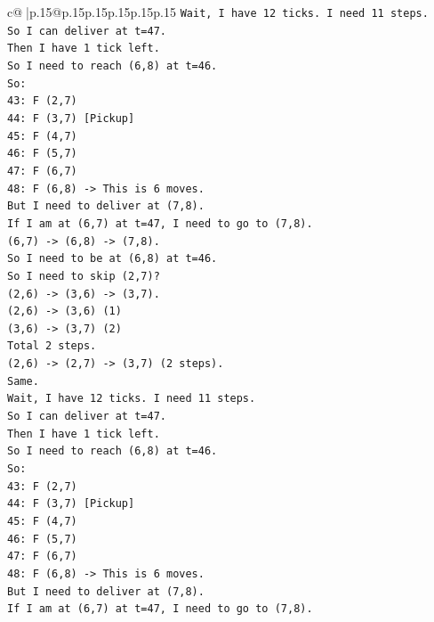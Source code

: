 \documentclass{article}
\begin{document}
{\begin{supertabular}{c@{$\;$}|p{.15\linewidth}@{}p{.15\linewidth}p{.15\linewidth}p{.15\linewidth}p{.15\linewidth}p{.15\linewidth}}
{{{\texttt{Wait, I have 12 ticks. I need 11 steps.} \\
\texttt{So I can deliver at t=47.} \\
\texttt{Then I have 1 tick left.} \\
\texttt{So I need to reach (6,8) at t=46.} \\
\texttt{So:} \\
\texttt{43: F (2,7)} \\
\texttt{44: F (3,7) {[}Pickup{]}} \\
\texttt{45: F (4,7)} \\
\texttt{46: F (5,7)} \\
\texttt{47: F (6,7)} \\
\texttt{48: F (6,8) {-}> This is 6 moves.} \\
\texttt{But I need to deliver at (7,8).} \\
\texttt{If I am at (6,7) at t=47, I need to go to (7,8).} \\
\texttt{(6,7) {-}> (6,8) {-}> (7,8).} \\
\texttt{So I need to be at (6,8) at t=46.} \\
\texttt{So I need to skip (2,7)?} \\
\texttt{(2,6) {-}> (3,6) {-}> (3,7).} \\
\texttt{(2,6) {-}> (3,6) (1)} \\
\texttt{(3,6) {-}> (3,7) (2)} \\
\texttt{Total 2 steps.} \\
\texttt{(2,6) {-}> (2,7) {-}> (3,7) (2 steps).} \\
\texttt{Same.} \\
\texttt{Wait, I have 12 ticks. I need 11 steps.} \\
\texttt{So I can deliver at t=47.} \\
\texttt{Then I have 1 tick left.} \\
\texttt{So I need to reach (6,8) at t=46.} \\
\texttt{So:} \\
\texttt{43: F (2,7)} \\
\texttt{44: F (3,7) {[}Pickup{]}} \\
\texttt{45: F (4,7)} \\
\texttt{46: F (5,7)} \\
\texttt{47: F (6,7)} \\
\texttt{48: F (6,8) {-}> This is 6 moves.} \\
\texttt{But I need to deliver at (7,8).} \\
\texttt{If I am at (6,7) at t=47, I need to go to (7,8).} \\
}}}
\end{supertabular}}
\end{document}
